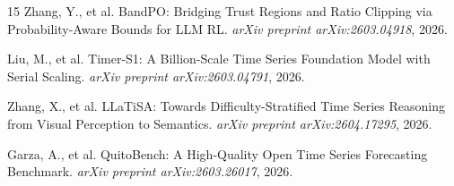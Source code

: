 \documentclass[11pt]{article}
\begin{document}
\begin{thebibliography}{15}
Zhang, Y., et al.
\newblock BandPO: Bridging Trust Regions and Ratio Clipping via Probability-Aware Bounds for LLM RL.
\newblock \emph{arXiv preprint arXiv:2603.04918}, 2026.

Liu, M., et al.
\newblock Timer-S1: A Billion-Scale Time Series Foundation Model with Serial Scaling.
\newblock \emph{arXiv preprint arXiv:2603.04791}, 2026.

Zhang, X., et al.
\newblock LLaTiSA: Towards Difficulty-Stratified Time Series Reasoning from Visual Perception to Semantics.
\newblock \emph{arXiv preprint arXiv:2604.17295}, 2026.

Garza, A., et al.
\newblock QuitoBench: A High-Quality Open Time Series Forecasting Benchmark.
\newblock \emph{arXiv preprint arXiv:2603.26017}, 2026.

\end{thebibliography}
\end{document}
